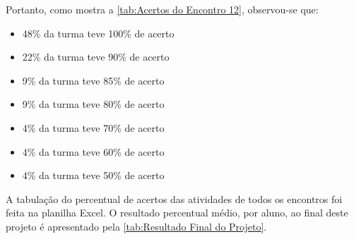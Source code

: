 Portanto, como mostra a \autoref{tab:Acertos do Encontro 12}, observou-se que:

\begin{itemize}
    \item 48\% da turma teve 100\% de acerto
    \item 22\% da turma teve 90\% de acerto
    \item 9\% da turma teve 85\% de acerto
    \item 9\% da turma teve 80\% de acerto
    \item 4\% da turma teve 70\% de acerto
    \item 4\% da turma teve 60\% de acerto
    \item 4\% da turma teve 50\% de acerto
\end{itemize}

A tabulação do percentual de acertos das atividades de todos os encontros foi feita na planilha Excel. O resultado percentual médio, por aluno, ao final deste projeto é apresentado pela \autoref{tab:Resultado Final do Projeto}.

